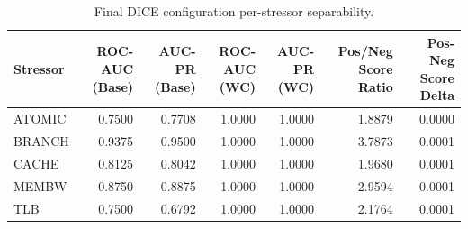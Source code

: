 \begin{table}[t]
\centering
\caption{Final DICE configuration per-stressor separability.}
\label{tab:dice_full_stressor}
\footnotesize
\begin{tabular}{lrrrrrr}
\toprule
Stressor & ROC-AUC (Base) & AUC-PR (Base) & ROC-AUC (WC) & AUC-PR (WC) & Pos/Neg Score Ratio & Pos-Neg Score Delta \\
\midrule
ATOMIC & 0.7500 & 0.7708 & 1.0000 & 1.0000 & 1.8879 & 0.0000 \\
BRANCH & 0.9375 & 0.9500 & 1.0000 & 1.0000 & 3.7873 & 0.0001 \\
CACHE & 0.8125 & 0.8042 & 1.0000 & 1.0000 & 1.9680 & 0.0001 \\
MEMBW & 0.8750 & 0.8875 & 1.0000 & 1.0000 & 2.9594 & 0.0001 \\
TLB & 0.7500 & 0.6792 & 1.0000 & 1.0000 & 2.1764 & 0.0001 \\
\bottomrule
\end{tabular}

\end{table}
